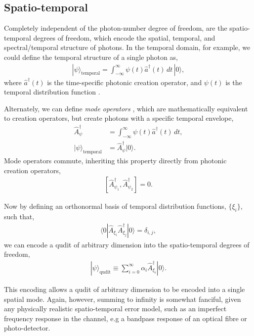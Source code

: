 \documentclass[aps, rmp, twocolumn, amsmath, amssymb, nofootinbib, superscriptaddress, longbibliography, floatfix, table-of-contents, eqsecnum]{revtex4-1}
\newcommand{\bra}[1]{\langle#1|}
\newcommand{\ket}[1]{|#1\rangle}
\begin{document}
%
%

\subsection{Spatio-temporal} \label{sec:spatio_temporal} 

Completely independent of the photon-number degree of freedom, are the spatio-temporal degrees of freedom, which encode the spatial, temporal, and spectral/temporal structure of photons. In the temporal domain, for example, we could define the temporal structure of a single photon as,
\begin{align}
\ket\psi_\text{temporal} = \int_{-\infty}^\infty \psi(t) \hat{a}^\dag(t)\,dt\,\ket{0},
\end{align}
where $\hat{a}^\dag(t)$ is the time-specific photonic creation operator, and $\psi(t)$ is the temporal distribution function \cite{bib:RohdeFreqTemp05}.

Alternately, we can define \textit{mode operators} \cite{bib:RohdeMauererSilberhorn07}, which are mathematically equivalent to creation operators, but create photons with a specific temporal envelope,
\begin{align}
\hat{A}^\dag_\psi &= \int_{-\infty}^\infty \psi(t) \hat{a}^\dag(t)\,dt, \nonumber \\
\ket\psi_\text{temporal} &= \hat{A}^\dag_\psi \ket{0}.
\end{align}
Mode operators commute, inheriting this property directly from photonic creation operators,
\begin{align}
\left[\hat{A}^\dag_{\psi_1},\hat{A}^\dag_{\psi_2}\right]=0.
\end{align}

Now by defining an orthonormal basis of temporal distribution functions, $\{\xi_i\}$, such that,
\begin{align} \label{eq:spec_orth_def}
\bra{0} \hat{A}_{\xi_i} \hat{A}^\dag_{\xi_j}\ket{0} = \delta_{i,j},
\end{align}
we can encode a qudit of arbitrary dimension into the spatio-temporal degrees of freedom,
\begin{align}
\ket\psi_\text{qudit} \equiv \sum_{i=0}^\infty \alpha_i \hat{A}^\dag_{\xi_i} \ket{0}.
\end{align}

This encoding allows a qudit of arbitrary dimension to be encoded into a single spatial mode. Again, however, summing to infinity is somewhat fanciful, given any physically realistic spatio-temporal error model, such as an imperfect frequency response in the channel, e.g a bandpass response of an optical fibre or photo-detector.
\end{document}
